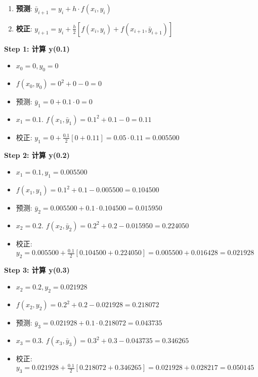 \documentclass[11pt]{article}
\providecommand{\tightlist}{%
      \setlength{\itemsep}{0pt}\setlength{\parskip}{0pt}}
\begin{document}
\begin{enumerate}
\def\labelenumi{\arabic{enumi}.}
\tightlist
\item
  \textbf{预测}: \(\bar{y}_{i+1} = y_i + h \cdot f(x_i, y_i)\)
\item
  \textbf{校正}:
  \(y_{i+1} = y_i + \frac{h}{2} [f(x_i, y_i) + f(x_{i+1}, \bar{y}_{i+1})]\)
\end{enumerate}

\textbf{Step 1: 计算 y(0.1)}

\begin{itemize}
\tightlist
\item
  \(x_0 = 0, y_0 = 0\)
\item
  \(f(x_0, y_0) = 0^2 + 0 - 0 = 0\)
\item
  预测: \(\bar{y}_1 = 0 + 0.1 \cdot 0 = 0\)
\item
  \(x_1 = 0.1\). \(f(x_1, \bar{y}_1) = 0.1^2 + 0.1 - 0 = 0.11\)
\item
  校正:
  \(y_1 = 0 + \frac{0.1}{2} [0 + 0.11] = 0.05 \cdot 0.11 = \mathbf{0.005500}\)
\end{itemize}

\textbf{Step 2: 计算 y(0.2)}

\begin{itemize}
\tightlist
\item
  \(x_1 = 0.1, y_1 = 0.005500\)
\item
  \(f(x_1, y_1) = 0.1^2 + 0.1 - 0.005500 = 0.104500\)
\item
  预测: \(\bar{y}_2 = 0.005500 + 0.1 \cdot 0.104500 = 0.015950\)
\item
  \(x_2 = 0.2\).
  \(f(x_2, \bar{y}_2) = 0.2^2 + 0.2 - 0.015950 = 0.224050\)
\item
  校正:
  \(y_2 = 0.005500 + \frac{0.1}{2} [0.104500 + 0.224050] = 0.005500 + 0.016428 = \mathbf{0.021928}\)
\end{itemize}

\textbf{Step 3: 计算 y(0.3)}

\begin{itemize}
\tightlist
\item
  \(x_2 = 0.2, y_2 = 0.021928\)
\item
  \(f(x_2, y_2) = 0.2^2 + 0.2 - 0.021928 = 0.218072\)
\item
  预测: \(\bar{y}_3 = 0.021928 + 0.1 \cdot 0.218072 = 0.043735\)
\item
  \(x_3 = 0.3\).
  \(f(x_3, \bar{y}_3) = 0.3^2 + 0.3 - 0.043735 = 0.346265\)
\item
  校正:
  \(y_3 = 0.021928 + \frac{0.1}{2} [0.218072 + 0.346265] = 0.021928 + 0.028217 = \mathbf{0.050145}\)
\end{itemize}
\end{document}

